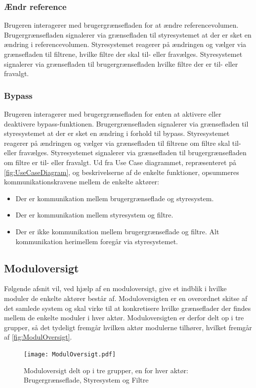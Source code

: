 \subsubsection{Ændr reference} 
\label{AendreReference}
%
Brugeren interagerer med brugergrænsefladen for at ændre referencevolumen. Brugergrænsefladen signalerer via grænsefladen til styresystemet at der er sket en ændring i referencevolumen. Styresystemet reagerer på ændringen og vælger via grænsefladen til filtrene, hvilke filtre der skal til- eller fravælges. Styresystemet signalerer via grænsefladen til brugergrænsefladen hvilke filtre der er til- eller fravalgt.

\subsubsection{Bypass}
\label{Bypass}
%
Brugeren interagerer med brugergrænsefladen for enten at aktivere eller deaktivere bypass-funktionen. Brugergrænsefladen signalerer via grænsefladen til styresystemet at der er sket en ændring i forhold til bypass. Styresystemet reagerer på ændringen og vælger via grænsefladen til filtrene om filtre skal til- eller fravælges. Styresystemet signalerer via grænsefladen til brugergrænsefladen om filtre er til- eller fravalgt. 
\blankline 
Ud fra Use Case diagrammet, repræsenteret på \autoref{fig:UseCaseDiagram}, og beskrivelserne af de enkelte funktioner, opsummeres kommunikationskravene mellem de enkelte aktører:
\blankline
\begin{itemize}
  \item Der er kommunikation mellem brugergrænseflade og styresystem.
  \item Der er kommunikation mellem styresystem og filtre.
  \item Der er ikke kommunikation mellem brugergrænseflade og filtre. Alt kommunikation herimellem foregår via styresystemet.
\end{itemize}
   
%  
\subsection{Moduloversigt} 
\label{Moduloversigt}
%
Følgende afsnit vil, ved hjælp af en moduloversigt, give et indblik i hvilke moduler de enkelte aktører består af. Moduloversigten er en overordnet skitse af det samlede system og skal virke til at konkretisere hvilke grænseflader der findes mellem de enkelte moduler i hver aktør. Moduloversigten er derfor delt op i tre grupper, så det tydeligt fremgår hvilken aktør modulerne tilhører, hvilket fremgår af \autoref{fig:ModulOversigt}. 
%
\begin{figure}[H]
	\centering
	\texttt{[image: ModulOversigt.pdf]}
	\caption{Moduloversigt delt op i tre grupper, en for hver aktør: \textcolor{xRed}{Brugergrænseflade}, \textcolor{xGreen}{Styresystem} og \textcolor{xBlue}{Filtre}}
	\label{fig:ModulOversigt}
\end{figure}
\noindent
%
